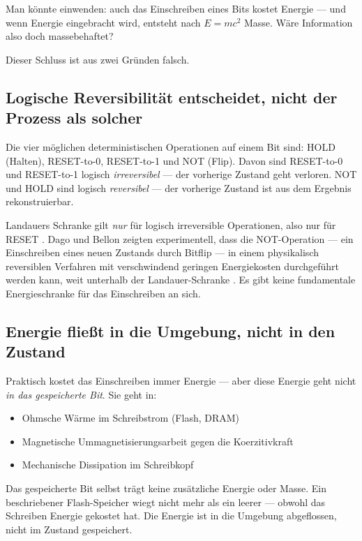 Man könnte einwenden: auch das Einschreiben eines Bits kostet Energie —
und wenn Energie eingebracht wird, entsteht nach $E = mc^2$ Masse. Wäre
Information also doch massebehaftet?

Dieser Schluss ist aus zwei Gründen falsch.

\subsection{Logische Reversibilität entscheidet, nicht der Prozess als solcher}

Die vier möglichen deterministischen Operationen auf einem Bit sind:
HOLD (Halten), RESET-to-0, RESET-to-1 und NOT (Flip). Davon sind
RESET-to-0 und RESET-to-1 logisch \emph{irreversibel} — der vorherige
Zustand geht verloren. NOT und HOLD sind logisch \emph{reversibel} —
der vorherige Zustand ist aus dem Ergebnis rekonstruierbar.

Landauers Schranke gilt \emph{nur} für logisch irreversible Operationen,
also nur für RESET \cite{Landauer1961}. Dago und Bellon zeigten
experimentell, dass die NOT-Operation — ein Einschreiben eines neuen
Zustands durch Bitflip — in einem physikalisch reversiblen Verfahren
mit verschwindend geringen Energiekosten durchgeführt werden kann, weit
unterhalb der Landauer-Schranke \cite{Dago2023}. Es gibt keine
fundamentale Energieschranke für das Einschreiben an sich.

\subsection{Energie fließt in die Umgebung, nicht in den Zustand}

Praktisch kostet das Einschreiben immer Energie — aber diese Energie
geht nicht \emph{in das gespeicherte Bit}. Sie geht in:

\begin{itemize}
  \item Ohmsche Wärme im Schreibstrom (Flash, DRAM)
  \item Magnetische Ummagnetisierungsarbeit gegen die Koerzitivkraft
  \item Mechanische Dissipation im Schreibkopf
\end{itemize}

Das gespeicherte Bit selbst trägt keine zusätzliche Energie oder Masse.
Ein beschriebener Flash-Speicher wiegt nicht mehr als ein leerer —
obwohl das Schreiben Energie gekostet hat. Die Energie ist in die
Umgebung abgeflossen, nicht im Zustand gespeichert.


